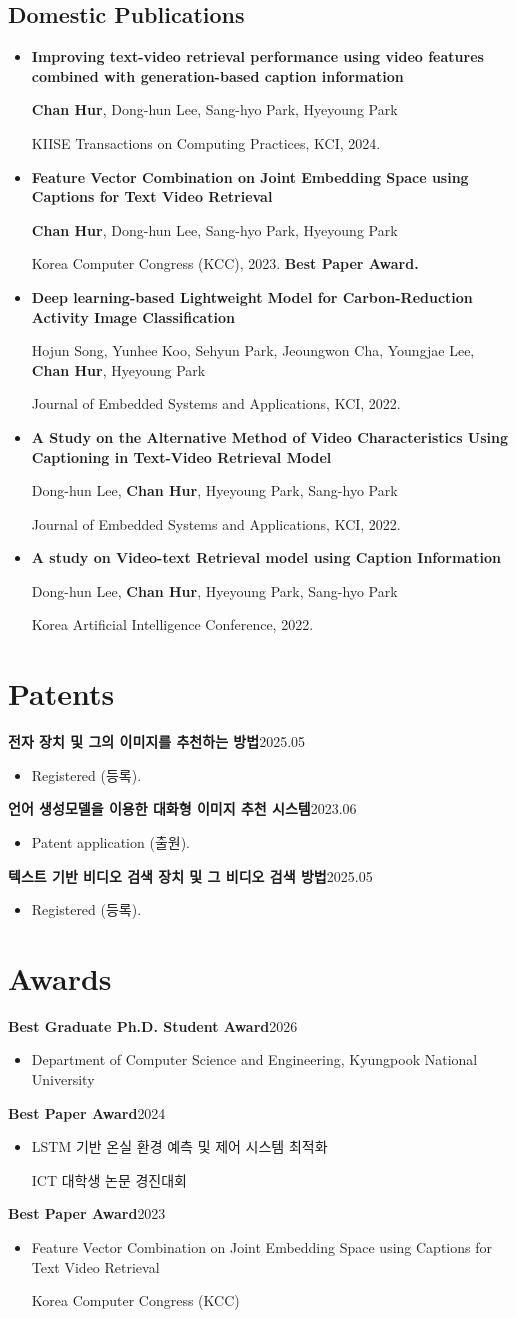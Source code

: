 \documentclass[10pt,a4paper]{article}
\newif\ifRemVS
\newcommand{\rvs}{\ifRemVS\vspace{-1.5ex}\fi\global\RemVSfalse}
\newcommand{\me}{\textbf{Chan Hur}}
\newcommand{\cvpub}[3]{%
  \item\begin{minipage}[t]{\linewidth}
    \textbf{#1}\par
    #2\par
    #3\par
  \end{minipage}}
\newcommand{\cventry}[3]{%
  \noindent\begin{minipage}{\linewidth}
    \rvs
    {\small\textbf{#1}\hfill #2\par}
    \begin{itemize}[topsep=2pt]\item #3\end{itemize}
  \end{minipage}\par}
\begin{document}
\subsection{Domestic Publications}
\begin{itemize}
\cvpub{Improving text-video retrieval performance using video features combined with generation-based caption information}
  {\me, Dong-hun Lee, Sang-hyo Park, Hyeyoung Park}
  {KIISE Transactions on Computing Practices, KCI, 2024.}
\cvpub{Feature Vector Combination on Joint Embedding Space using Captions for Text Video Retrieval}
  {\me, Dong-hun Lee, Sang-hyo Park, Hyeyoung Park}
  {Korea Computer Congress (KCC), 2023. \textbf{Best Paper Award.}}
\cvpub{Deep learning-based Lightweight Model for Carbon-Reduction Activity Image Classification}
  {Hojun Song, Yunhee Koo, Sehyun Park, Jeoungwon Cha, Youngjae Lee, \me, Hyeyoung Park}
  {Journal of Embedded Systems and Applications, KCI, 2022.}
\cvpub{A Study on the Alternative Method of Video Characteristics Using Captioning in Text-Video Retrieval Model}
  {Dong-hun Lee, \me, Hyeyoung Park, Sang-hyo Park}
  {Journal of Embedded Systems and Applications, KCI, 2022.}
\cvpub{A study on Video-text Retrieval model using Caption Information}
  {Dong-hun Lee, \me, Hyeyoung Park, Sang-hyo Park}
  {Korea Artificial Intelligence Conference, 2022.}
\end{itemize}

\section{Pat\color{black}ents}
\cventry{전자 장치 및 그의 이미지를 추천하는 방법}{2025.05}{Registered (등록).}
\cventry{언어 생성모델을 이용한 대화형 이미지 추천 시스템}{2023.06}{Patent application (출원).}
\cventry{텍스트 기반 비디오 검색 장치 및 그 비디오 검색 방법}{2025.05}{Registered (등록).}

\section{Awa\color{black}rds}
\cventry{Best Graduate Ph.D. Student Award}{2026}{%
  Department of Computer Science and Engineering, Kyungpook National University}
\cventry{Best Paper Award}{2024}{%
  LSTM 기반 온실 환경 예측 및 제어 시스템 최적화\par
  ICT 대학생 논문 경진대회}
\cventry{Best Paper Award}{2023}{%
  Feature Vector Combination on Joint Embedding Space using Captions for Text Video Retrieval\par
  Korea Computer Congress (KCC)}
\end{document}
